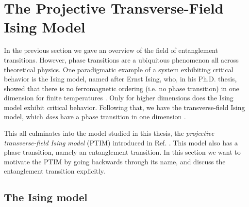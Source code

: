 \clearpage
\section{The Projective Transverse-Field Ising Model}\label{sec:intro-ptim}

In the previous section we gave an overview of the field of entanglement
transitions. However, phase transitions are a ubiquitous phenomenon all across
theoretical physics. One paradigmatic example of a system exhibiting critical
behavior is the Ising model, named after Ernst Ising, who, in his Ph.D. thesis,
showed that there is no ferromagnetic ordering (i.e. no phase transition) in
one dimension for finite temperatures \cite{isingBeitragZurTheorie1925}. Only
for higher dimensions does the Ising model exhibit critical behavior. Following
that, we have the transverse-field Ising model, which \emph{does} have a phase
transition in one dimension \cite{langLectureNotesTopological2021}. 

This all culminates into the model studied in this thesis, the
\emph{projective transverse-field Ising model} (PTIM) introduced in Ref.
\cite{langEntanglementTransitionProjective2020}. This model also has a
phase transition, namely an entanglement transition. In this section we want to
motivate the PTIM by going backwards through its name, and discuss the
entanglement transition explicitly. 

\subsection{The Ising model}



